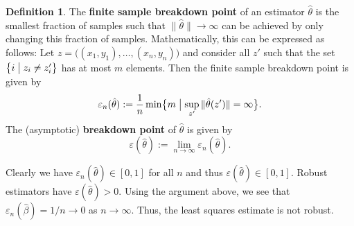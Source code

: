 \documentclass[
  a4paper,
]{article}
\theoremstyle{definition}
\newtheorem{definition}{Definition}[section]
\theoremstyle{definition}
\theoremstyle{definition}
\theoremstyle{definition}
\theoremstyle{remark}
\begin{document}
\begin{definition}
The \textbf{finite sample breakdown point} of an estimator \(\hat\theta\)
is the smallest fraction of samples such that
\(\|\hat\theta\| \to \infty\) can be achieved by only changing this
fraction of samples. Mathematically, this can be expressed as follows:
Let \(z = \bigl( (x_1, y_1), \ldots, (x_n, y_n) \bigr)\) and consider
all \(z'\) such that the set \(\bigl\{ i \bigm| z_i \neq z'_i \bigr\}\) has
at most \(m\) elements. Then the finite sample breakdown point
is given by
\begin{equation*}
  \varepsilon_n(\hat\theta)
  := \frac1n \min \bigl\{ m \bigm| \sup_{z'} \|\hat\theta(z')\| = \infty \bigr\}.
\end{equation*}
The (asymptotic) \textbf{breakdown point} of \(\hat\theta\) is given
by
\begin{equation*}
  \varepsilon(\hat\theta)
  := \lim_{n\to\infty} \varepsilon_n(\hat\theta).
\end{equation*}
\end{definition}

Clearly we have \(\varepsilon_n(\hat\theta) \in [0, 1]\) for all \(n\)
and thus \(\varepsilon(\hat\theta) \in [0, 1]\).
Robust estimators have \(\varepsilon(\hat\theta) > 0\).
Using the argument above, we see that \(\varepsilon_n(\hat\beta) = 1/n \to 0\)
as \(n\to \infty\). Thus, the least squares estimate is not robust.
\end{document}
